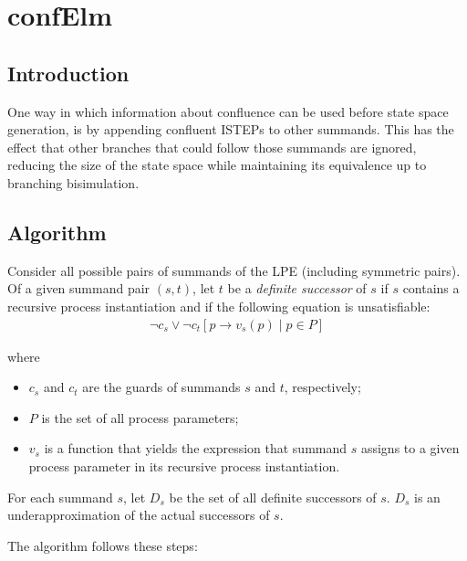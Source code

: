 \chapter{confElm}

\section{Introduction}
One way in which information about confluence can be used before state space generation, is by appending confluent ISTEPs to other summands.
This has the effect that other branches that could follow those summands are ignored, reducing the size of the state space while maintaining its equivalence up to branching bisimulation.

\section{Algorithm}

Consider all possible pairs of summands of the LPE (including symmetric pairs).
Of a given summand pair $(s, t)$, let $t$ be a \emph{definite successor} of $s$ if $s$ contains a recursive process instantiation and if the following equation is unsatisfiable:
\begin{align*}
\neg c_s \lor \neg {c_t}[p \rightarrow v_s(p) \;|\; p \in P]
\end{align*}

where

\begin{itemize}
\item $c_s$ and $c_t$ are the guards of summands $s$ and $t$, respectively;
\item $P$ is the set of all process parameters;
\item $v_s$ is a function that yields the expression that summand $s$ assigns to a given process parameter in its recursive process instantiation.
\end{itemize}

For each summand $s$, let $D_s$ be the set of all definite successors of $s$.
$D_s$ is an underapproximation of the actual successors of $s$.

\clearpage
The algorithm follows these steps:

